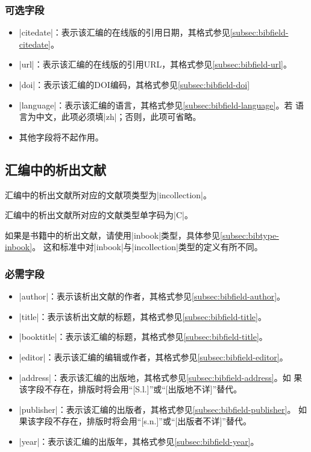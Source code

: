 \subsubsection{可选字段}

\begin{itemize}
\item |citedate|：表示该汇编的在线版的引用日期，其格式参见\ref{subsec:bibfield-citedate}。
\item |url|：表示该汇编的在线版的引用URL，其格式参见\ref{subsec:bibfield-url}。
\item |doi|：表示该汇编的DOI编码，其格式参见\ref{subsec:bibfield-doi}
\item |language|：表示该汇编的语言，其格式参见\ref{subsec:bibfield-language}。若
  语言为中文，此项必须填|zh|；否则，此项可省略。
\item 其他字段将不起作用。
\end{itemize}

\subsection{汇编中的析出文献}\label{subsec:bibtype-incollection}

汇编中的析出文献所对应的{\BibTeX}文献项类型为|incollection|。

汇编中的析出文献所对应的文献类型\cite{gbt3469-1983}单字码为|C|。

\begin{note}
如果是书籍中的析出文献，请使用|inbook|类型，具体参见\ref{subsec:bibtype-inbook}。
这和标准{\BibTeX}中对|inbook|与|incollection|类型的定义有所不同。
\end{note}

\subsubsection{必需字段}

\begin{itemize}
\item |author|：表示该析出文献的作者，其格式参见\ref{subsec:bibfield-author}。
\item |title|：表示该析出文献的标题，其格式参见\ref{subsec:bibfield-title}。
\item |booktitle|：表示该汇编的标题，其格式参见\ref{subsec:bibfield-title}。
\item |editor|：表示该汇编的编辑或作者，其格式参见\ref{subsec:bibfield-editor}。
\item |address|：表示该汇编的出版地，其格式参见\ref{subsec:bibfield-address}。如
  果该字段不存在，{\BibTeX}排版时将会用``[S.l.]''或``[出版地不详]''替代。
\item |publisher|：表示该汇编的出版者，其格式参见\ref{subsec:bibfield-publisher}。
  如果该字段不存在，{\BibTeX}排版时将会用``[s.n.]''或``[出版者不详]''替代。
\item |year|：表示该汇编的出版年，其格式参见\ref{subsec:bibfield-year}。
\end{itemize}

